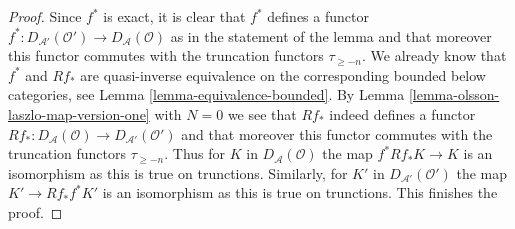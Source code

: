 \documentclass[10pt,a4paper]{amsart}
\theoremstyle{plain}
\theoremstyle{definition}
\theoremstyle{remark}
\numberwithin{equation}{subsection}
\begin{document}
\begin{proof}
Since $f^*$ is exact, it is clear that $f^*$ defines a functor
$f^* : D_{\mathcal{A}'}(\mathcal{O}') \to D_\mathcal{A}(\mathcal{O})$
as in the statement of the lemma and that moreover this
functor commutes with the truncation functors $\tau_{\geq -n}$.
We already know that $f^*$ and $Rf_*$ are quasi-inverse
equivalence on the corresponding bounded below categories,
see Lemma \ref{lemma-equivalence-bounded}.
By Lemma \ref{lemma-olsson-laszlo-map-version-one}
with $N = 0$ we see that $Rf_*$ indeed defines a functor
$Rf_* : D_\mathcal{A}(\mathcal{O}) \to D_{\mathcal{A}'}(\mathcal{O}')$
and that moreover this functor commutes with
the truncation functors $\tau_{\geq -n}$.
Thus for $K$ in $D_\mathcal{A}(\mathcal{O})$ the map
$f^*Rf_*K \to K$ is an isomorphism as this is true
on trunctions.
Similarly, for $K'$ in $D_{\mathcal{A}'}(\mathcal{O}')$ the map
$K' \to Rf_*f^*K'$ is an isomorphism as this is true
on trunctions.
This finishes the proof.
\end{proof}
\end{document}
